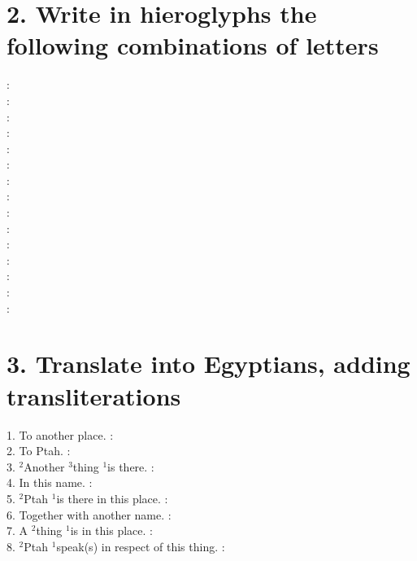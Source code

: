 \documentclass{article}
\begin{document}
\begin{spacing}{1.7}
\section*{2. Write in hieroglyphs the following combinations of letters}
\begin{multicols}{4}
\noindent{}: \\ 
: \\
: \\
: \\
: \\
: \\
: \\
: \\
: \\
: \\
: \\
: \\
: \\
: \\
: \\
\end{multicols}

\section*{3. Translate into Egyptians, adding transliterations}
1. To another place. : \\
2. To Ptah. : \\
3. $^2$Another $^3$thing $^1$is there. : \\
4. In this name. : \\
5. $^2$Ptah $^1$is there in this place. : \\
6. Together with another name. : \\
7. A $^2$thing $^1$is in this place. : \\
8. $^2$Ptah $^1$speak(s) in respect of this thing. : \\










\end{spacing}
\end{document}
